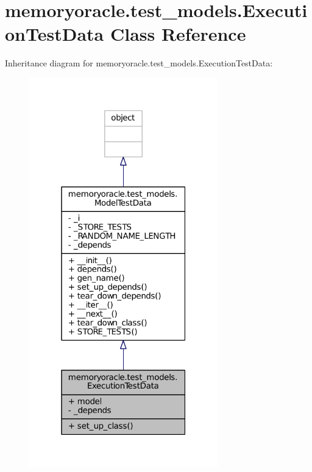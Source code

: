 \hypertarget{classmemoryoracle_1_1test__models_1_1ExecutionTestData}{}\section{memoryoracle.\+test\+\_\+models.\+Execution\+Test\+Data Class Reference}
\label{classmemoryoracle_1_1test__models_1_1ExecutionTestData}


Inheritance diagram for memoryoracle.\+test\+\_\+models.\+Execution\+Test\+Data\+:\nopagebreak
\begin{figure}[H]
\begin{center}
\leavevmode
\includegraphics[width=232pt]{classmemoryoracle_1_1test__models_1_1ExecutionTestData__inherit__graph}
\end{center}
\end{figure}



